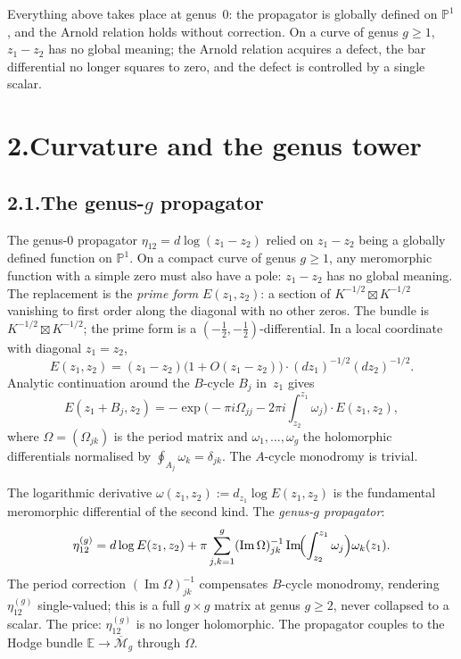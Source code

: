 \documentclass[11pt,reqno]{amsart}
\theoremstyle{definition}
\theoremstyle{remark}
\providecommand{\bP}{\mathbb{P}}
\numberwithin{equation}{section}
\begin{document}
Everything above takes place at genus~$0$: the propagator is globally
defined on $\bP^1$, and the Arnold relation holds without correction.
On a curve of genus $g\ge 1$, $z_1-z_2$ has no global meaning; the
Arnold relation acquires a defect, the bar differential no longer
squares to zero, and the defect is controlled by a single scalar.


\section*{2.\quad Curvature and the genus tower}

\subsection*{2.1.\enspace The genus-$g$ propagator}

The genus-$0$ propagator $\eta_{12}=d\log(z_1-z_2)$ relied on
$z_1-z_2$ being a globally defined function on $\bP^1$. On a compact
curve of genus $g\ge 1$, any meromorphic function with a simple zero
must also have a pole: $z_1-z_2$ has no global meaning. The
replacement is the \emph{prime form}
$E(z_1,z_2)$: a section of $K^{-1/2}\boxtimes K^{-1/2}$
vanishing to first order along the diagonal with no other zeros. The
bundle is $K^{-1/2}\boxtimes K^{-1/2}$; the prime form is a
$(-\tfrac12,-\tfrac12)$-differential. In a local coordinate with
diagonal $z_1=z_2$,
\[
E(z_1,z_2)=(z_1-z_2)\bigl(1+O(z_1-z_2)\bigr)\cdot(dz_1)^{-1/2}(dz_2)^{-1/2}.
\]
Analytic continuation around the $B$-cycle $B_j$ in~$z_1$ gives
\[
E(z_1+B_j,z_2)=-\exp\bigl(-\pi i\Omega_{jj}-2\pi i\textstyle\int_{z_2}^{z_1}\omega_j\bigr)\cdot E(z_1,z_2),
\]
where $\Omega=(\Omega_{jk})$ is the period matrix and
$\omega_1,\ldots,\omega_g$ the holomorphic differentials normalised by
$\oint_{A_j}\omega_k=\delta_{jk}$. The $A$-cycle monodromy is trivial.

The logarithmic derivative
$\omega(z_1,z_2):=d_{z_1}\log E(z_1,z_2)$ is the fundamental
meromorphic differential of the second kind. The \emph{genus-$g$
propagator}:
\[
\eta^{(g)}_{12}=d\log E(z_1,z_2)+\pi\sum_{j,k=1}^g(\operatorname{Im}\Omega)^{-1}_{jk}\operatorname{Im}\!\Bigl(\int_{z_2}^{z_1}\omega_j\Bigr)\omega_k(z_1).
\]
The period correction $(\operatorname{Im}\Omega)^{-1}_{jk}$ compensates
$B$-cycle monodromy, rendering $\eta^{(g)}_{12}$ single-valued; this
is a full $g\times g$ matrix at genus $g\ge 2$, never collapsed to a
scalar. The price:
$\eta^{(g)}_{12}$ is no longer holomorphic. The propagator couples to
the Hodge bundle $\mathbb E\to\overline{\mathcal M}_g$ through
$\Omega$.
\end{document}
